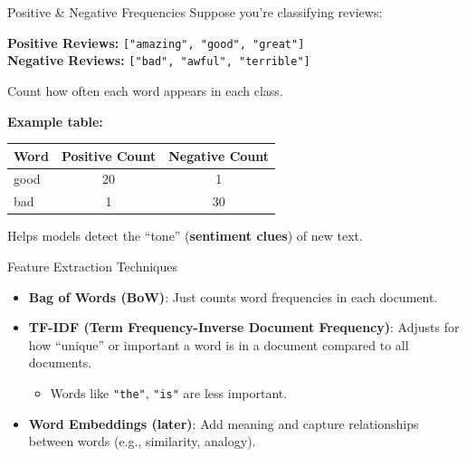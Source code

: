 \begin{frame}{Positive \& Negative Frequencies}
    Suppose you're classifying reviews:

    \vspace{0.5em}
    \textbf{Positive Reviews:} \texttt{["amazing", "good", "great"]} \\
    \textbf{Negative Reviews:} \texttt{["bad", "awful", "terrible"]}

    \vspace{1em}
    Count how often each word appears in each class.

    \vspace{1em}
    \textbf{Example table:}
    \begin{table}[ht]
        \centering
        \renewcommand{\arraystretch}{1.5}
        \begin{tabular}{lcc}
            \toprule
            \textbf{Word} & \textbf{Positive Count} & \textbf{Negative Count} \\
            \midrule
            good & 20 & 1 \\
            bad & 1 & 30 \\
            \bottomrule
        \end{tabular}
    \end{table}

    \vspace{0.5em}
    Helps models detect the “tone” (\textbf{sentiment clues}) of new text.
\end{frame}

\begin{frame}{Feature Extraction Techniques}
    \begin{itemize}
        \item \textbf{Bag of Words (BoW)}: Just counts word frequencies in each document.
        \item \textbf{TF-IDF (Term Frequency-Inverse Document Frequency)}: Adjusts for how “unique” or important a word is in a document compared to all documents.
        \begin{itemize}
            \item Words like \texttt{"the"}, \texttt{"is"} are less important.
        \end{itemize}
        \item \textbf{Word Embeddings (later)}: Add meaning and capture relationships between words (e.g., similarity, analogy).
    \end{itemize}
\end{frame}


